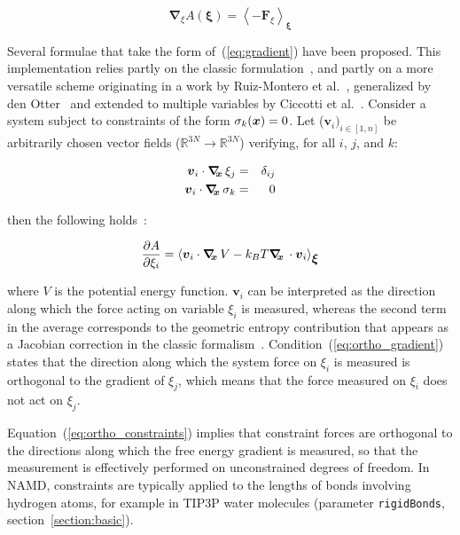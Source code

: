 \begin{equation}
  \label{eq:gradient}
  \bm{\nabla}_\xi A(\bm{\xi}) = \left\langle -\bm{F}_\xi \right\rangle_\bm{\xi}
\end{equation}

Several formulae that take the form of~(\ref{eq:gradient}) have been
proposed.  This implementation relies partly on the classic
formulation~\cite{Carter1989}, and partly on a more versatile scheme
originating in a work by Ruiz-Montero et al.~\cite{Ruiz-Montero1997},
generalized by den Otter~\cite{denOtter2000} and extended to multiple
variables by Ciccotti et al.~\cite{Ciccotti2005}.  Consider a system
subject to constraints of the form $\sigma_{k}({\mbox{\boldmath{$x$}}}) = 0$.  Let
($\bm{v}_{i})_{i\in[1,n]}$ be arbitrarily chosen vector fields
($\mathbb{R}^{3N}\rightarrow\mathbb{R}^{3N}$) verifying, for all $i$,
$j$, and $k$:

\begin{eqnarray}
\label{eq:ortho_gradient}
{\mbox{\boldmath{$v$}}}_{i} \cdot \mbox{\boldmath$\nabla_{\!\!x}\,$} \xi_{j}    & = & \delta_{ij}\\
\label{eq:ortho_constraints}
{\mbox{\boldmath{$v$}}}_{i} \cdot \mbox{\boldmath$\nabla_{\!\!x}\,$} \sigma_{k} & = & 0
\end{eqnarray}

then the following holds~\cite{Ciccotti2005}:

\begin{equation}
\label{eq:gradient_vector}
\frac{\partial A}{\partial \xi_{i}} = \left\langle {\mbox{\boldmath{$v$}}}_{i} \cdot \mbox{\boldmath$\nabla_{\!\!x}\,$} V
- k_B T \mbox{\boldmath$\nabla_{\!\!x}\,$} \cdot {\mbox{\boldmath{$v$}}}_{i} \right\rangle_{\mbox{\boldmath{$\xi$}}}
\end{equation}

where $V$ is the potential energy function.
$\bm{v}_{i}$ can be interpreted as the direction along which the force
acting on variable $\xi_{i}$ is measured, whereas the second term in the
average corresponds to the geometric entropy contribution that appears
as a Jacobian correction in the classic formalism~\cite{Carter1989}.
Condition~(\ref{eq:ortho_gradient}) states that the direction along
which the system force on $\xi_{i}$ is measured is orthogonal to the
gradient of $\xi_{j}$, which means that the force measured on $\xi_{i}$
does not act on $\xi_{j}$.

Equation~(\ref{eq:ortho_constraints}) implies that constraint forces
are orthogonal to the directions along which the free energy gradient is
measured, so that the measurement is effectively performed on unconstrained
degrees of freedom. In NAMD, constraints are typically applied to the lengths of
bonds involving hydrogen atoms, for example in TIP3P water molecules
(parameter \texttt{rigidBonds}, section~\ref{section:basic}).


